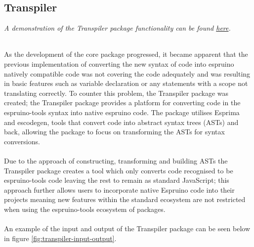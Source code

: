 \documentclass{l4proj}
\begin{document}
\subsection{Transpiler}
\begin{center}
\textit{A demonstration of the Transpiler package functionality can be found \href{https://demos-mu.vercel.app/demo/transpiler}{here}.} 
\end{center}
\\
As the development of the core package progressed, it became apparent that the previous implementation of converting the new syntax of code into espruino natively compatible code was not covering the code adequately and was resulting in basic features such as variable declaration or any statements with a scope not translating correctly. To counter this problem, the Transpiler package was created; the Transpiler package provides a platform for converting code in the espruino-tools syntax into native espruino code. The package utilises Esprima and escodegen, tools that convert code into abstract syntax trees (ASTs) and back, allowing the package to focus on transforming the ASTs for syntax conversions.
\\ \\
Due to the approach of constructing, transforming and building ASTs the Transpiler package creates a tool which only converts code recognised to be espruino-tools code leaving the rest to remain as standard JavaScript; this approach further allows users to incorporate native Espruino code into their projects meaning new features within the standard ecosystem are not restricted when using the espruino-tools ecosystem of packages.
\\ \\ 
An example of the input and output of the Transpiler package can be seen below in figure \ref{fig:transpiler-input-output}.
\end{document}
